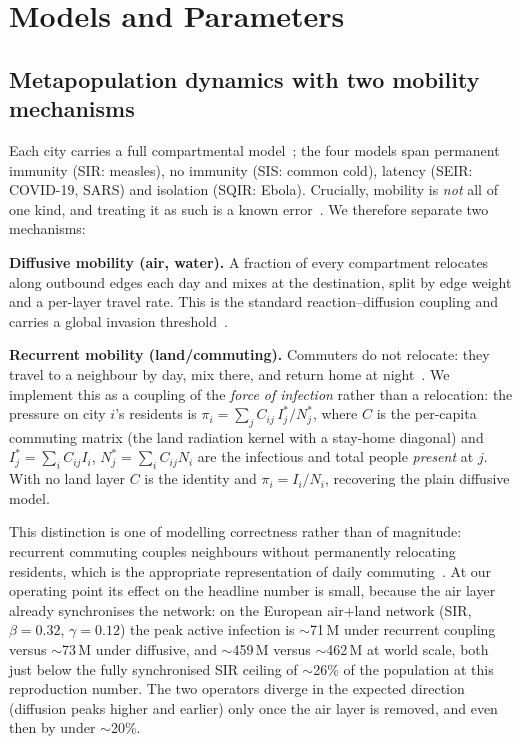 \documentclass{sigkddExp}
\begin{document}
\section{Models and Parameters}
\subsection{Metapopulation dynamics with two mobility mechanisms}
Each city carries a full compartmental model~\cite{colizza:reactiondiffusion};
the four models span permanent immunity (SIR: measles), no immunity (SIS:
common cold), latency (SEIR: COVID-19, SARS) and isolation (SQIR: Ebola).
Crucially, mobility is \emph{not} all of one kind, and treating it as such is
a known error~\cite{balcan:recurrent}. We therefore separate two mechanisms:

\textbf{Diffusive mobility (air, water).} A fraction of every compartment
relocates along outbound edges each day and mixes at the destination, split
by edge weight and a per-layer travel rate. This is the standard
reaction--diffusion coupling and carries a global invasion
threshold~\cite{colizza:invasion}.

\textbf{Recurrent mobility (land/commuting).} Commuters do not relocate: they
travel to a neighbour by day, mix there, and return home at
night~\cite{balcan:recurrent,sorianopanos:multiplex}. We implement this as a
coupling of the \emph{force of infection} rather than a relocation: the
pressure on city $i$'s residents is
$\pi_i=\sum_j C_{ij}\, I^{*}_j/N^{*}_j$, where $C$ is the per-capita commuting
matrix (the land radiation kernel with a stay-home diagonal) and
$I^{*}_j=\sum_i C_{ij} I_i$, $N^{*}_j=\sum_i C_{ij} N_i$ are the infectious and
total people \emph{present} at $j$. With no land layer $C$ is the identity and
$\pi_i=I_i/N_i$, recovering the plain diffusive model.

This distinction is one of modelling correctness rather than of magnitude:
recurrent commuting couples neighbours without permanently relocating residents,
which is the appropriate representation of daily commuting~\cite{balcan:recurrent}.
At our operating point its effect on the headline number is small, because the
air layer already synchronises the network: on the European air$+$land network
(SIR, $\beta=0.32$, $\gamma=0.12$) the peak active infection is $\sim$71\,M under
recurrent coupling versus $\sim$73\,M under diffusive, and $\sim$459\,M versus
$\sim$462\,M at world scale, both just below the fully synchronised SIR ceiling
of $\sim$26\% of the population at this reproduction number. The two operators
diverge in the expected direction (diffusion peaks higher and earlier) only once
the air layer is removed, and even then by under $\sim$20\%.
\end{document}
